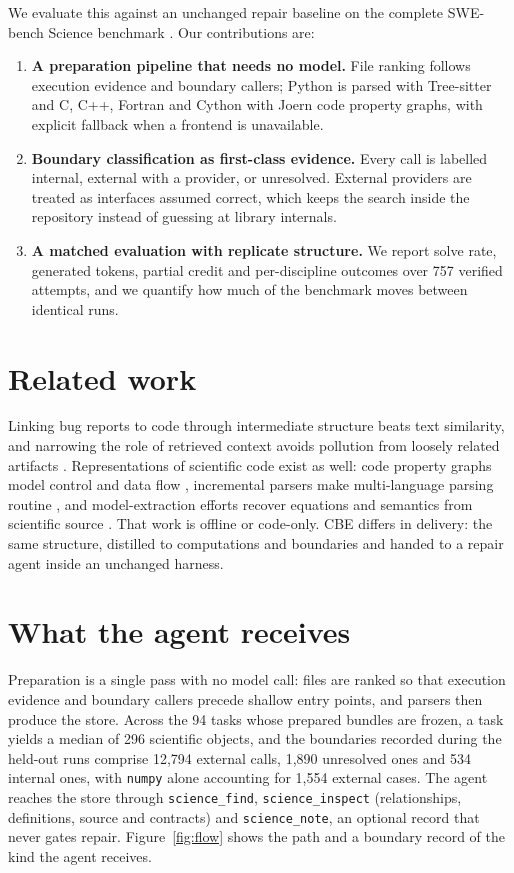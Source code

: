 \documentclass[10pt]{article}
\begin{document}
We evaluate this against an unchanged repair baseline on the complete SWE-bench Science benchmark
\cite{xu2026swebenchscience}. Our contributions are:

\begin{enumerate}
  \item \textbf{A preparation pipeline that needs no model.} File ranking follows execution evidence and
        boundary callers; Python is parsed with Tree-sitter and C, C++, Fortran and Cython with Joern
        code property graphs, with explicit fallback when a frontend is unavailable.
  \item \textbf{Boundary classification as first-class evidence.} Every call is labelled internal,
        external with a provider, or unresolved. External providers are treated as interfaces assumed
        correct, which keeps the search inside the repository instead of guessing at library internals.
  \item \textbf{A matched evaluation with replicate structure.} We report solve rate, generated tokens,
        partial credit and per-discipline outcomes over 757 verified attempts, and we quantify how much
        of the benchmark moves between identical runs.
\end{enumerate}

\section{Related work}
Linking bug reports to code through intermediate structure beats text similarity, and narrowing the role
of retrieved context avoids pollution from loosely related artifacts
\cite{niu2023ablots,niu2023rat,niu2025tvr,pan2025coverage}. Representations of scientific code exist as
well: code property graphs model control and data flow \cite{yamaguchi2014cpg}, incremental parsers make
multi-language parsing routine \cite{treesitter}, and model-extraction efforts recover equations and
semantics from scientific source \cite{skema2024gromet,automates2020}. That work is offline or code-only.
CBE differs in delivery: the same structure, distilled to computations and boundaries and handed to a
repair agent inside an unchanged harness.

\section{What the agent receives}
Preparation is a single pass with no model call: files are ranked so that execution evidence and boundary
callers precede shallow entry points, and parsers then produce the store. Across the 94 tasks whose
prepared bundles are frozen, a task yields a median of 296 scientific objects, and the boundaries recorded
during the held-out runs comprise 12{,}794 external calls, 1{,}890 unresolved ones and 534 internal ones,
with \texttt{numpy} alone accounting for 1{,}554 external cases. The agent reaches the store through
\texttt{science\_find}, \texttt{science\_inspect} (relationships, definitions, source and contracts) and
\texttt{science\_note}, an optional record that never gates repair. Figure~\ref{fig:flow} shows the path
and a boundary record of the kind the agent receives.
\end{document}
